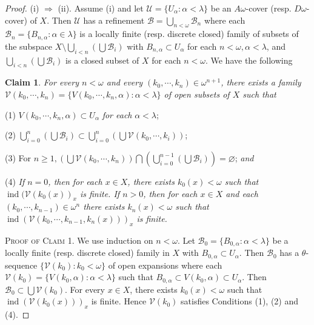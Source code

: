 \documentclass[main.tex]{subfiles}
\begin{document}
\begin{proof}
(i) $\Rightarrow$  (ii). Assume (i) and let $\mathscr{U} = \{U_\alpha: \alpha < \lambda\}$
be an $A\omega$-cover  (resp. $D\omega$-cover) of $X$. Then $\mathscr{U}$
 has a refinement $\mathscr{B}=\bigcup_{n<\omega}\mathscr{B}_n$ where each $\mathscr{B}_n=\{B_{n,\alpha}: \alpha\in \lambda\}$ is a
locally finite (resp. discrete closed) family of subsets of the
subspace $X\setminus \bigcup_{i<n}(\bigcup\mathscr{B}_i)$ 
with ${B}_{n,\alpha}\subset U_{\alpha}$ for each $n < \omega, \alpha < \lambda$,
and $\bigcup_{i<n}(\bigcup\mathscr{B}_i)$ is a closed subset of $X$ for each $n < \omega$.
We have the following

\textbf{Claim 1}. \textit{For every $n<\omega$ and every $(k_0, \cdots, k_n)\in\omega^{n+1}$,
there exists a family $\mathscr{V}(k_0, \cdots, k_n) = \{V(k_0, \cdots, k_n,\alpha): \alpha<\lambda\}$
of open subsets of $X$ such that}

(1)  $V(k_0, \cdots, k_n,\alpha)\subset U_\alpha$ \textit{ for each } $\alpha< \lambda$;

(2) $\bigcup_{i=0}^n (\bigcup\mathscr{B}_i)\subset
 \bigcup_{i=0}^n (\bigcup\mathscr{V}(k_0, \cdots, k_i))$;

(3) For $n \ge 1, (\bigcup\mathscr{V}(k_0, \cdots, k_n)) \bigcap 
(\bigcup_{i=0}^{n-1} (\bigcup\mathscr{B}_i))
= \varnothing$; \textit{ and }

(4) \textit{ If $n = 0$, then for each $x\in X$, there exists $k_0(x) < \omega$
such that $\operatorname{ind}(\mathscr{V}(k_0(x))_x$ is finite.
If $n > 0$, then for each $x\in X$ and each $(k_0, \cdots, k_{n-1})\in\omega^{n}$
there exists $k_n(x) <\omega$ such that 
$\operatorname{ind}(\mathscr{V}(k_0, \cdots, k_{n-1}, k_n(x)))_x$ is finite.}

\textsc{Proof of Claim 1}. We use induction on $n < \omega$. 
Let $\mathscr{B}_0 = \{B_{0, \alpha}: \alpha < \lambda\}$ be a locally finite (resp. discrete closed) 
family in $X$ with $B_{0, \alpha} \subset U_\alpha$. 
Then $\mathscr{B}_0$ has a $\theta$-sequence 
$\{\mathscr{V}(k_0): k_0 < \omega\}$ of open expansions where each 
$\mathscr{V}(k_0) = \{V(k_0, \alpha): \alpha < \lambda\}$ such that 
$B_{0, \alpha} \subset V(k_0, \alpha) \subset U_\alpha$. Then
$\mathscr{B}_0 \subset \bigcup \mathscr{V}(k_0)$. 
For every $x\in X$, there exists $k_0(x) < \omega$ such that 
$\operatorname{ind}(\mathscr{V}(k_0(x)))_x$
 is finite. Hence  $\mathscr{V}(k_0) $ satisfies Conditions (1), (2) and (4). 
 

\end{proof}
\end{document}
